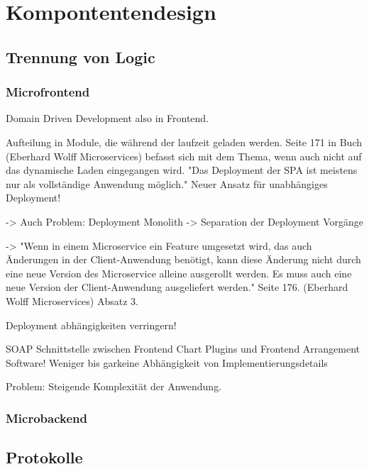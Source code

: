 \chapter{Kompontentendesign}
\label{chap:komponentendesign}


\section{Trennung von Logic}
\label{sec:trennungvonlogic}


\subsection{Microfrontend}
\label{subsec:Microfrontend}
Domain Driven Development also in Frontend.

Aufteilung in Module, die während der laufzeit geladen werden.
Seite 171 in Buch (Eberhard Wolff Microservices) befasst sich mit dem
Thema, wenn auch nicht auf das dynamische Laden eingegangen wird.
"Das Deployment der SPA ist meistens nur als vollständige Anwendung möglich."
Neuer Ansatz für unabhängiges Deployment!

-> Auch Problem: Deployment Monolith -> Separation der Deployment Vorgänge

-> "Wenn in einem Microservice ein Feature umgesetzt wird, das auch Änderungen
in der Client-Anwendung benötigt, kann diese Änderung nicht durch eine neue
Version des Microservice alleine ausgerollt werden. Es muss auch eine neue Version
der Client-Anwendung ausgeliefert werden." Seite 176.  (Eberhard Wolff Microservices)
Absatz 3.

Deployment abhängigkeiten verringern!

SOAP Schnittstelle zwischen Frontend Chart Plugins und Frontend Arrangement Software!
Weniger bis garkeine Abhängigkeit von Implementierungsdetails

Problem: Steigende Komplexität der Anwendung.

\subsection{Microbackend}
\label{subsec:microbackend}

\section{Protokolle}
\label{sec:protokolle}
